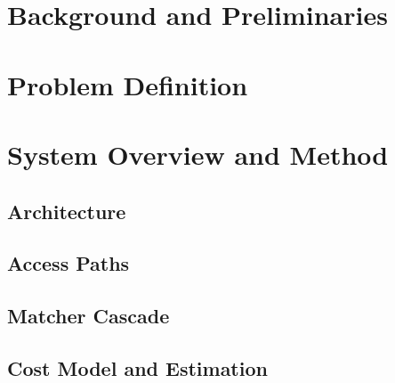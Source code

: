 \documentclass[conference]{IEEEtran}
\begin{document}
\section{Background and Preliminaries}

\section{Problem Definition}

\section{System Overview and Method}
\subsection{Architecture}

\subsection{Access Paths}

\subsection{Matcher Cascade}

\subsection{Cost Model and Estimation}
\end{document}
